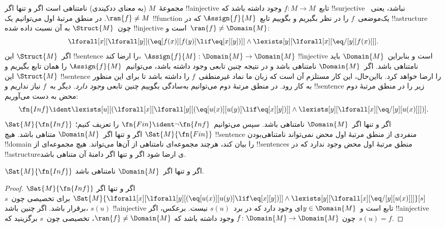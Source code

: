 \documentclass[../../../include/open-logic-section]{subfiles}
\begin{document}


مجموعهٔ~$M$ (به معنای ددکیندی) نامتناهی است اگر و تنها اگر
!!a{injective} تابع~$f\colon M \to M$ وجود داشته باشد که !!{surjective}
نباشد، یعنی~$\ran{f} \neq M$. در منطق مرتبهٔ اول می‌توانیم یک
!!{function} یک‌موضعی~$f$ را در نظر بگیریم و بگوییم تابع~$\Assign{f}{M}$
که در !!a{structure} چون~$\Struct{M}$ به آن نسبت داده شده !!{injective}
است و~$\ran{f} \neq \Domain{M}$:
\[
\lforall[x][\lforall[y][(\eq[f(x)][f(y)] \lif \eq[x][y])]] \land
\lexists[y][\lforall[x][\eq/[y][f(x)]]].
\]
اگر~$\Struct{M}$ این !!{sentence} را ارضا کند، $\Assign{f}{M}:
\Domain{M} \to \Domain{M}$ !!{injective} است و بنابراین~$\Domain{M}$
باید نامتناهی باشد. اگر~$\Domain{M}$ نامتناهی باشد و در نتیجه چنین
تابعی وجود داشته باشد، می‌توانیم~$\Assign{f}{M}$ را همان تابع بگیریم و
$\Struct{M}$ این !!{sentence} را ارضا خواهد کرد. بااین‌حال، این کار
مستلزم آن است که زبان ما نماد غیرمنطقی~$f$ را داشته باشد تا برای این
منظور به کار رود. در منطق مرتبهٔ دوم می‌توانیم به‌سادگی بگوییم چنین
تابعی \emph{وجود دارد}. دیگر به~$f$ نیاز نداریم و !!{sentence} زیر را
در منطق مرتبهٔ دوم محض به دست می‌آوریم:
\[
\fn{Inf} \ident \lexists[u][(\lforall[x][\lforall[y][(\eq[u(x)][u(y)]
      \lif \eq[x][y])]] \land \lexists[y][\lforall[x][\eq/[y][u(x)]]])].
\]
$\Sat{M}{\fn{Inf}}$ اگر و تنها اگر~$\Domain{M}$ نامتناهی باشد. سپس
می‌توانیم~$\fn{Fin} \ident \lnot \fn{Inf}$ را تعریف کنیم؛
$\Sat{M}{\fn{Fin}}$ اگر و تنها اگر~$\Domain{M}$ متناهی باشد. هیچ
!!{sentence} منفردی از منطق مرتبهٔ اول محض نمی‌تواند نامتناهی‌بودن
!!{domain} را بیان کند، هرچند مجموعه‌ای نامتناهی از آن‌ها می‌تواند.
هیچ مجموعه‌ای از !!{sentence}s منطق مرتبهٔ اول محض وجود ندارد که در
!!a{structure}ی ارضا شود اگر و تنها اگر دامنهٔ آن متناهی باشد.

\begin{prop}
$\Sat{M}{\fn{Inf}}$ اگر و تنها اگر~$\Domain{M}$ نامتناهی باشد.
\end{prop}

\begin{proof}
$\Sat{M}{\fn{Inf}}$ اگر و تنها اگر
  $\Sat{M}{\lforall[x][\lforall[y][(\eq[u(x)][u(y)] \lif \eq[x][y])]]
    \land \lexists[y][\lforall[x][\eq/[y][u(x)]]]}[s]$ برای تخصیصی
  چون~$s$ برقرار باشد. اگر چنین
باشد، $s(u)$ !!a{injective} تابع است و~$y \in \Domain{M}$ای وجود دارد
که در برد~$s(u)$ نیست. برعکس، اگر !!a{injective} چون
$f\colon \Domain{M} \to \Domain{M}$ وجود داشته باشد که
$\ran{f} \neq \Domain{M}$، تخصیصی چون~$s$ برگزینید که~$s(u) = f$.
\end{proof}
\end{document}
